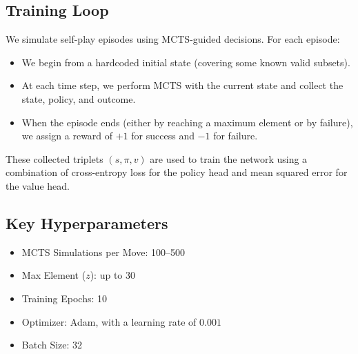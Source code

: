 \documentclass[12pt]{article}
\begin{document}
\subsection{Training Loop}
We simulate self-play episodes using MCTS-guided decisions. For each episode:
\begin{itemize}
    \item We begin from a hardcoded initial state (covering some known valid subsets).
    \item At each time step, we perform MCTS with the current state and collect the state, policy, and outcome.
    \item When the episode ends (either by reaching a maximum element or by failure), we assign a reward of $+1$ for success and $-1$ for failure.
\end{itemize}
These collected triplets $(s, \pi, v)$ are used to train the network using a combination of cross-entropy loss for the policy head and mean squared error for the value head.

\subsection{Key Hyperparameters}
\begin{itemize}
    \item MCTS Simulations per Move: 100--500
    \item Max Element ($z$): up to 30
    \item Training Epochs: 10
    \item Optimizer: Adam, with a learning rate of $0.001$
    \item Batch Size: 32
\end{itemize}

  
\end{document}
